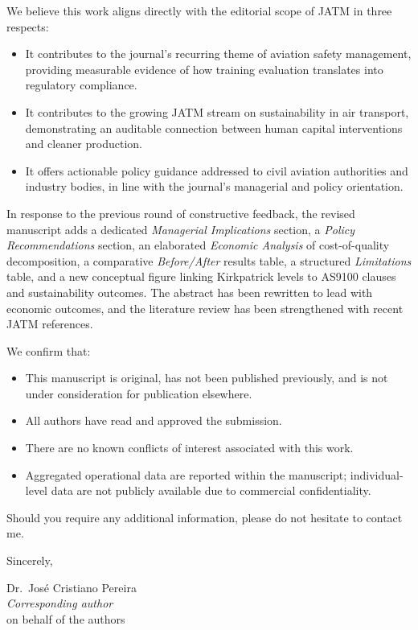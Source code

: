 \documentclass[11pt,a4paper]{article}
\begin{document}
We believe this work aligns directly with the editorial scope of JATM in
three respects:

\begin{itemize}
  \item It contributes to the journal's recurring theme of aviation safety
        management, providing measurable evidence of how training
        evaluation translates into regulatory compliance.
  \item It contributes to the growing JATM stream on sustainability in
        air transport, demonstrating an auditable connection between human
        capital interventions and cleaner production.
  \item It offers actionable policy guidance addressed to civil aviation
        authorities and industry bodies, in line with the journal's
        managerial and policy orientation.
\end{itemize}

In response to the previous round of constructive feedback, the revised
manuscript adds a dedicated \textit{Managerial Implications} section, a
\textit{Policy Recommendations} section, an elaborated \textit{Economic
Analysis} of cost-of-quality decomposition, a comparative
\textit{Before/After} results table, a structured \textit{Limitations}
table, and a new conceptual figure linking Kirkpatrick levels to AS9100
clauses and sustainability outcomes. The abstract has been rewritten to
lead with economic outcomes, and the literature review has been
strengthened with recent JATM references.

We confirm that:

\begin{itemize}
  \item This manuscript is original, has not been published previously,
        and is not under consideration for publication elsewhere.
  \item All authors have read and approved the submission.
  \item There are no known conflicts of interest associated with this work.
  \item Aggregated operational data are reported within the manuscript;
        individual-level data are not publicly available due to commercial
        confidentiality.
\end{itemize}

Should you require any additional information, please do not hesitate to
contact me.

\bigskip

\noindent Sincerely,

\bigskip\bigskip

\noindent
Dr.\ Jos\'e Cristiano Pereira \\
\textit{Corresponding author}\\
on behalf of the authors
\end{document}

